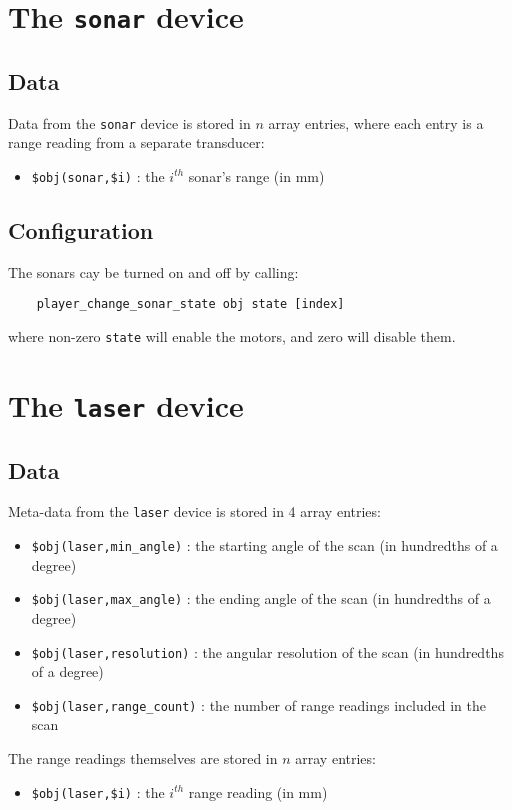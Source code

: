 \documentclass[11pt]{article}
\begin{document}
\section{The {\tt sonar} device}
\subsection{Data}
Data from the {\tt sonar} device is stored in $n$ array entries, where each
entry is a range reading from a separate transducer:
\begin{itemize}
\item {\tt \$obj(sonar,\$i)} : the $i^{th}$ sonar's range (in mm)
\end{itemize}

\subsection{Configuration}
The sonars cay be turned on and off by calling:
\begin{verbatim}
    player_change_sonar_state obj state [index]
\end{verbatim}
where non-zero {\tt state} will enable the motors, and zero will disable them.

\section{The {\tt laser} device}
\subsection{Data}
Meta-data from the {\tt laser} device is stored in 4 array entries:
\begin{itemize}
\item {\tt \$obj(laser,min\_angle)} : the starting angle of the scan (in
hundredths of a degree)
\item {\tt \$obj(laser,max\_angle)} : the ending angle of the scan (in
hundredths of a degree)
\item {\tt \$obj(laser,resolution)} : the angular resolution of the scan (in
hundredths of a degree)
\item {\tt \$obj(laser,range\_count)} : the number of range readings included
in the scan
\end{itemize}
The range readings themselves are stored in $n$ array entries:
\begin{itemize}
\item {\tt \$obj(laser,\$i)} : the $i^{th}$ range reading (in mm)
\end{itemize}
\end{document}
